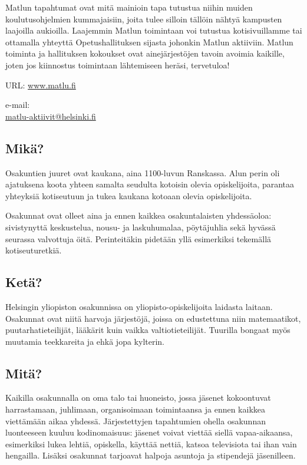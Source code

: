 \documentclass[a5paper, 8pt, twocolumn]{book} %
\numberwithin{equation}{section}
\begin{document}
Matlun tapahtumat ovat mitä mainioin
tapa tutustua niihin muiden koulutusohjelmien kummajaisiin,
joita tulee silloin tällöin nähtyä
kampusten laajoilla aukioilla. Laajemmin
Matlun toimintaan voi tutustua kotisivuillamme
tai ottamalla yhteyttä Opetushallituksen
sijasta johonkin Matlun aktiiviin.
Matlun toiminta ja hallituksen kokoukset ovat
ainejärjestöjen tavoin avoimia kaikille, joten jos
kiinnostus toimintaan lähtemiseen heräsi, tervetuloa!

\noindent URL: \url{www.matlu.fi}

\noindent e-mail: \\\url{matlu-aktiivit@helsinki.fi}

\subsection*{Mikä?}
Osakuntien juuret ovat kaukana, aina
1100-luvun Ranskassa. Alun perin oli
ajatuksena koota yhteen samalta seudulta
kotoisin olevia opiskelijoita, parantaa yhteyksiä
kotiseutuun ja tukea kaukana kotoaan
olevia opiskelijoita.

Osakunnat ovat olleet aina ja ennen
kaikkea osakuntalaisten yhdessäoloa: sivistynyttä keskustelua, nousu- ja laskuhumalaa,
pöytäjuhlia sekä hyvässä seurassa
valvottuja öitä. Perinteitäkin pidetään
yllä esimerkiksi tekemällä kotiseuturetkiä.
\subsection*{Ketä?}
Helsingin yliopiston osakunnissa on
yliopisto-opiskelijoita laidasta laitaan. Osakunnat
ovat niitä harvoja järjestöjä, joissa
on edustettuna niin matemaatikot, puutarhatieteilijät,
lääkärit kuin vaikka valtiotieteilijät.
Tuurilla bongaat myös muutamia
teekkareita ja ehkä jopa kylterin.
\subsection*{Mitä?}
Kaikilla osakunnalla on oma talo tai huoneisto, jossa jäsenet kokoontuvat harrastamaan, juhlimaan, organisoimaan toimintaansa ja ennen kaikkea viettämään aikaa yhdessä. Järjestettyjen tapahtumien ohella osakunnan luonteeseen kuuluu kodinomaisuus: jäsenet voivat viettää siellä vapaa-aikaansa, esimerkiksi lukea lehtiä, opiskella, käyttää nettiä, katsoa televisiota tai ihan vain hengailla. Lisäksi osakunnat tarjoavat halpoja asuntoja ja stipendejä jäsenilleen.
\end{document}
